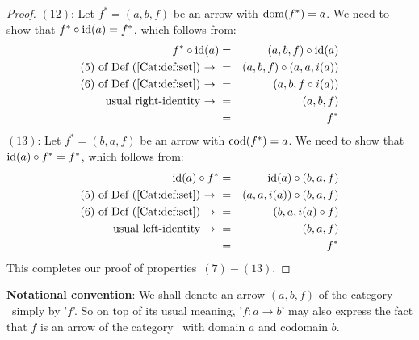 \begin{proof}
    $(12)$: Let $f^{*}=(a,b,f)$ be an arrow with $\mbox{\rm dom}(f^{*})=a$. We need to 
    show that $f^{*}\circ\mbox{\rm id}(a)=f^{*}$, which follows from:
        \begin{eqnarray*}f^{*}\circ\mbox{\rm id}(a)
            &=&(a,b,f)\circ\mbox{\rm id}(a)\\
            \mbox{$(5)$ of Def~(\ref{Cat:def:set})\ $\rightarrow$\ } 
            &=&(a,b,f)\circ(a,a,i(a))\\
            \mbox{$(6)$ of Def~(\ref{Cat:def:set})\ $\rightarrow$\ } 
            &=&(a,b,f\circ i(a))\\
            \mbox{usual right-identity\ $\rightarrow$\ }
            &=&(a,b,f)\\
            &=&f^{*}
        \end{eqnarray*}
    $(13)$: Let $f^{*}=(b,a,f)$ be an arrow with $\mbox{\rm cod}(f^{*})=a$. We need to 
    show that $\mbox{\rm id}(a)\circ f^{*}=f^{*}$, which follows from:
        \begin{eqnarray*}\mbox{\rm id}(a)\circ f^{*}
            &=&\mbox{\rm id}(a)\circ(b,a,f)\\
            \mbox{$(5)$ of Def~(\ref{Cat:def:set})\ $\rightarrow$\ } 
            &=&(a,a,i(a))\circ(b,a,f)\\
            \mbox{$(6)$ of Def~(\ref{Cat:def:set})\ $\rightarrow$\ } 
            &=&(b,a,i(a)\circ f)\\
            \mbox{usual left-identity\ $\rightarrow$\ }
            &=&(b,a,f)\\
            &=&f^{*}
        \end{eqnarray*}
This completes our proof of properties~$(7)-(13)$.
\end{proof}

\noindent
{\bf Notational convention}: We shall denote an arrow $(a,b,f)$ of the category 
\Set\ simply by '$f$'. So on top of its usual meaning, '$f:a\to b$' may also 
express the fact that $f$ is an arrow of the category \Set\ with domain $a$ and 
codomain $b$.




